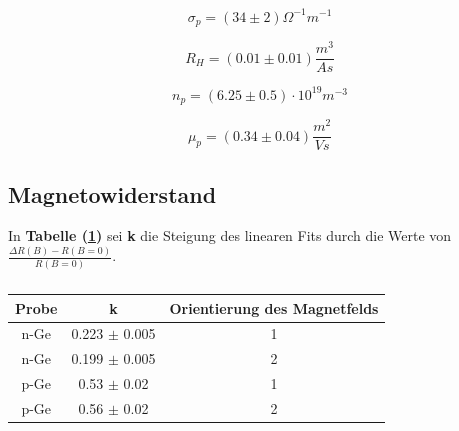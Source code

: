 \documentclass[12pt,a4paper,twopage]{article}
\begin{document}
$$ \boxed{ \sigma_p =  (34 \pm 2) \Omega^{-1}m^{-1} } $$  

$$ \boxed{ R_{H} = (0.01 \pm 0.01) \frac{m^3}{As} } $$

$$ \boxed {n_p = (6.25 \pm 0.5 ) \cdot 10^{19} m^{-3} }$$

$$ \boxed{ \mu_p = (0.34 \pm 0.04) \frac{m^2}{Vs} }$$


\subsection*{Magnetowiderstand}
In \textbf{Tabelle (\ref{magtab})} sei \textbf{k} die Steigung des linearen Fits durch die Werte von $\frac{\Delta R(B)-R(B=0)}{R(B=0)}$.
\begin{table}[H]
\begin{tabular}{|c|c|c|}
\hline 
Probe & k & Orientierung des Magnetfelds\\
\hline
n-Ge & 0.223 $\pm$ 0.005 & 1 \\
n-Ge & 0.199 $\pm$ 0.005 & 2 \\
\hline
p-Ge & 0.53 $\pm$ 0.02 & 1 \\
p-Ge & 0.56 $\pm$ 0.02& 2\\
\hline
\end{tabular}
\caption{\label{magtab}}
\end{table}
\end{document}
